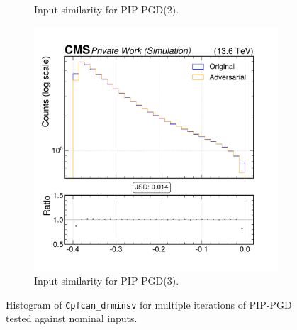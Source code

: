 \begin{figure}[h]
\begin{subfigure}[t]{0.32\textwidth}
    \caption*{Input similarity for PIP-PGD(2).}
  \end{subfigure}\hfill
  \begin{subfigure}[t]{0.32\textwidth}
    \includegraphics[width=\linewidth]{media/output/features/compare/combined_it_3/cmp_cpf_arr_Cpfcan_drminsv.pdf}
    \caption*{Input similarity for PIP-PGD(3).}
  \end{subfigure}

  \caption*{Histogram of \texttt{Cpfcan\_drminsv} for multiple iterations of PIP-PGD tested against nominal inputs.}
  \label{fig:combined_input_Cpfcan_drminsv}
\end{figure}

